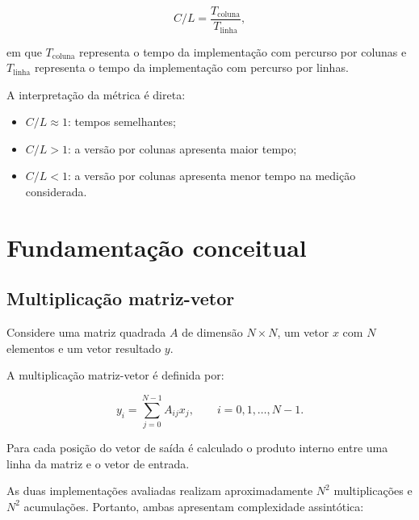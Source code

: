 \begin{equation}
    C/L =
    \frac{T_{\mathrm{coluna}}}
         {T_{\mathrm{linha}}},
    \label{eq:atvd01-cl}
\end{equation}

em que \(T_{\mathrm{coluna}}\) representa o tempo da implementação com
percurso por colunas e \(T_{\mathrm{linha}}\) representa o tempo da
implementação com percurso por linhas.

A interpretação da métrica é direta:

\begin{itemize}

    \item \(C/L \approx 1\): tempos semelhantes;

    \item \(C/L > 1\): a versão por colunas apresenta maior tempo;

    \item \(C/L < 1\): a versão por colunas apresenta menor tempo na
    medição considerada.

\end{itemize}



\section{Fundamentação conceitual}

\label{sec:atvd01-fundamentacao}

\subsection{Multiplicação matriz-vetor}

Considere uma matriz quadrada \(A\) de dimensão \(N \times N\), um vetor
\(x\) com \(N\) elementos e um vetor resultado \(y\).

A multiplicação matriz-vetor é definida por:

\begin{equation}
    y_i =
    \sum_{j=0}^{N-1}
    A_{ij}x_j,
    \qquad
    i = 0,1,\ldots,N-1.
    \label{eq:atvd01-mxv}
\end{equation}

Para cada posição do vetor de saída é calculado o produto interno entre
uma linha da matriz e o vetor de entrada.

As duas implementações avaliadas realizam aproximadamente \(N^2\)
multiplicações e \(N^2\) acumulações. Portanto, ambas apresentam
complexidade assintótica:

